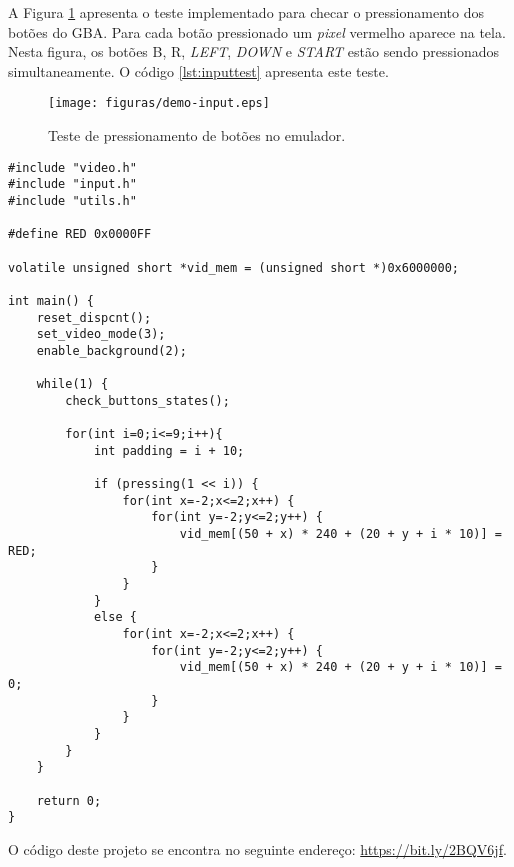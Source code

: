 A Figura \ref{demo-input} apresenta o teste implementado para checar o pressionamento dos botões do GBA. Para cada botão pressionado um \textit{pixel} vermelho aparece na tela. Nesta figura, os botões B, R, \textit{LEFT}, \textit{DOWN} e \textit{START} estão sendo pressionados simultaneamente. O código \ref{lst:inputtest} apresenta este teste.

\begin{figure}[H]
 \centering \texttt{[image: figuras/demo-input.eps]}
   \caption[Demonstração do pressionamento de botões no emulador]
    {Teste de pressionamento de botões no emulador.}
   \label{demo-input}
\end{figure}

\begin{lstlisting}[float,caption={Código de teste de \textit{input}.},label={lst:inputtest}]
#include "video.h"
#include "input.h"
#include "utils.h"

#define RED 0x0000FF

volatile unsigned short *vid_mem = (unsigned short *)0x6000000;

int main() {
	reset_dispcnt();
	set_video_mode(3);
	enable_background(2);

    while(1) {
        check_buttons_states();

        for(int i=0;i<=9;i++){
            int padding = i + 10;

            if (pressing(1 << i)) {
                for(int x=-2;x<=2;x++) {
                    for(int y=-2;y<=2;y++) {
                        vid_mem[(50 + x) * 240 + (20 + y + i * 10)] = RED;
                    }
                }
            }
            else {
                for(int x=-2;x<=2;x++) {
                    for(int y=-2;y<=2;y++) {
                        vid_mem[(50 + x) * 240 + (20 + y + i * 10)] = 0;
                    }
                }
            }
        }
    }

    return 0;
}
\end{lstlisting}

O código deste projeto se encontra no seguinte endereço: \url{https://bit.ly/2BQV6jf}.